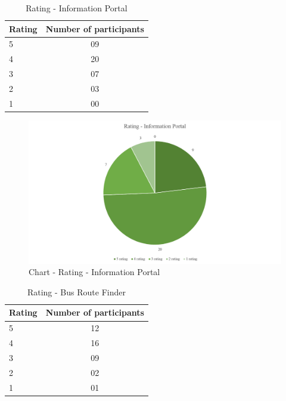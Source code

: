 \begin {itemize}
\begin{table} [h]
\centering
\begin{tabular}{|l|c|}
\hline
Rating & Number of participants \\
\hline
5	&09 \\
4	&20 \\
3	&07 \\
2	&03 \\
1	&00 \\
\hline
\end{tabular}
\caption{Rating - Information Portal}
\label{table-survey-rating-InformationPortal}
\end{table}

\begin {figure} [h]
\centering
\includegraphics [scale=0.5] {ratingInformationPortal}
\caption [Chart - Rating - Information Portal] {Chart - Rating - Information Portal}
\label {image-ratingInformationPortal}
\end {figure}

\begin{table} [h]
\centering
\begin{tabular}{|l|c|}
\hline
Rating & Number of participants \\
\hline
5	&12 \\
4	&16 \\
3	&09 \\
2	&02 \\
1	&01 \\
\hline
\end{tabular}
\caption{Rating - Bus Route Finder}
\label{table-survey-rating-BusRouteFinder}
\end{table}


\end{itemize}
